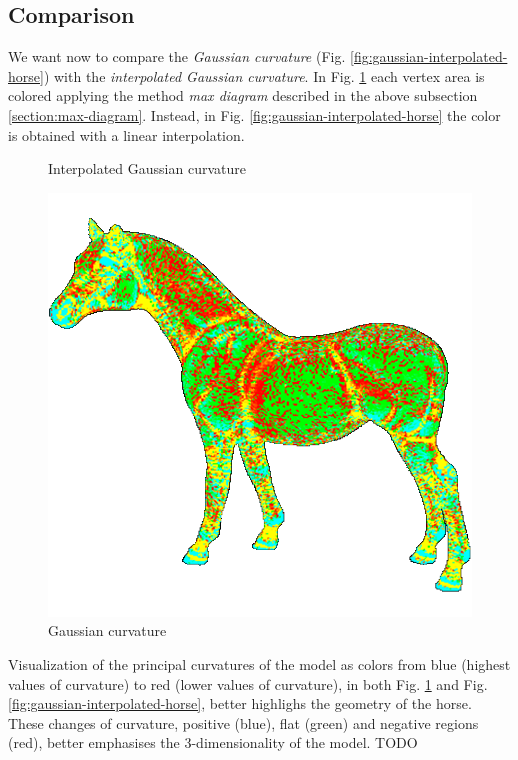 \subsection{Comparison}
We want now to compare the \textit{Gaussian curvature} (Fig. \ref{fig:gaussian-interpolated-horse}) with the \textit{interpolated Gaussian curvature}. In Fig. \ref{fig:gaussian-horse} each vertex area is colored applying the method \textit{max diagram} described in the above subsection \ref{section:max-diagram}. Instead, in Fig. \ref{fig:gaussian-interpolated-horse} the color is obtained with a linear interpolation.
\begin{figure}[!htb]
\centering
    \caption{Interpolated Gaussian curvature} \label{fig:gaussian-interpolated-horse}
  \endminipage\hfill
  \centering
    \includegraphics[width=\linewidth]{images/gaussian-horse.png}
    \caption{Gaussian curvature}\label{fig:gaussian-horse}
  \endminipage
  \end{figure}

Visualization of the principal curvatures of the model as colors from blue (highest values of curvature) to red (lower values of curvature), in both Fig. \ref{fig:gaussian-horse} and Fig. \ref{fig:gaussian-interpolated-horse}, better highlighs the geometry of the horse.
These changes of curvature, positive (blue), flat (green) and negative regions (red), better emphasises the 3-dimensionality of the model.
TODO

